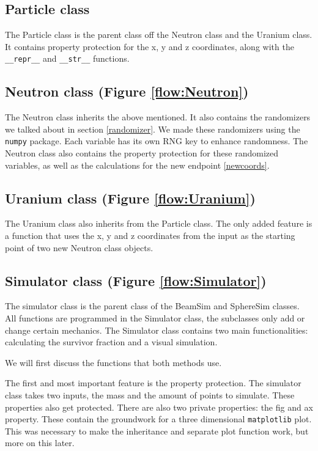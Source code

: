 \subsection{Particle class}
The Particle class is the parent class off the Neutron class and the Uranium class. It contains property protection for the x, y and z coordinates, along with the \lstinline[language=PythonPlus, style=colorEX]|__repr__| and \lstinline[language=PythonPlus, style=colorEX]|__str__| functions.
\subsection{Neutron class (Figure \ref{flow:Neutron})}
The Neutron class inherits the above mentioned. It also contains the randomizers we talked about in section \ref{randomizer}. We made these randomizers using the \lstinline[language=PythonPlus, style=colorEX]|numpy| package. Each variable has its own RNG key to enhance randomness. The Neutron class also contains the property protection for these randomized variables, as well as the calculations for the new endpoint \eqref{newcoords}.
\subsection{Uranium class (Figure \ref{flow:Uranium})}
The Uranium class also inherits from the Particle class. The only added feature is a function that uses the x, y and z coordinates from the input as the starting point of two new Neutron class objects.
\subsection{Simulator class (Figure \ref{flow:Simulator})}
The simulator class is the parent class of the BeamSim and SphereSim classes. All functions are programmed in the Simulator class, the subclasses only add or change certain mechanics.
The Simulator class contains two main functionalities: calculating the survivor fraction and a visual simulation.

We will first discuss the functions that both methods use.

The first and most important feature is the property protection. The simulator class takes two inputs, the mass and the amount of points to simulate. These properties also get protected.
There are also two private properties: the fig and ax property. These contain the groundwork for a three dimensional \lstinline[language=PythonPlus, style=colorEX]|matplotlib| plot. This was necessary to make the inheritance and separate plot function work, but more on this later.


